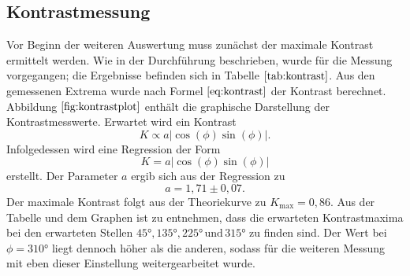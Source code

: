 \subsection{Kontrastmessung}
Vor Beginn der weiteren Auswertung muss zunächst der maximale Kontrast ermittelt werden.
Wie in der Durchführung beschrieben, wurde für die Messung vorgegangen; die Ergebnisse befinden sich in Tabelle $\ref{tab:kontrast}$.
Aus den gemessenen Extrema wurde nach Formel $\ref{eq:kontrast}$ der Kontrast berechnet.
Abbildung $\ref{fig:kontrastplot}$ enthält die graphische Darstellung der Kontrastmesswerte.
Erwartet wird ein Kontrast
\begin{equation}
  K \propto a|\cos(\phi)\sin(\phi)|.
\end{equation}
Infolgedessen wird eine Regression der Form
\begin{equation}
  K = a|\cos(\phi)\sin(\phi)|
\end{equation}
erstellt. Der Parameter $a$ ergib sich aus der Regression zu
\begin{equation*}
  a = 1,71 \pm 0,07.
\end{equation*}
Der maximale Kontrast folgt aus der Theoriekurve zu $K_\text{max}=0,86$.
Aus der Tabelle und dem Graphen ist zu entnehmen, dass die erwarteten Kontrastmaxima bei den erwarteten Stellen $45° , 135° , 225° \, \text{und} \, 315°$ zu finden sind.
Der Wert bei $\phi = 310°$ liegt dennoch höher als die anderen, sodass für die weiteren Messung mit eben dieser Einstellung weitergearbeitet wurde.
